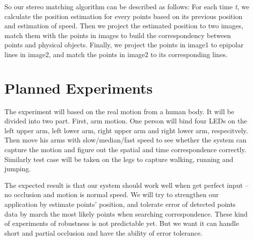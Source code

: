 \documentclass[10pt,twocolumn,letterpaper]{article}
\begin{document}
So our stereo matching algorithm can be described as follows: For each 
time {\em t}, we calculate the position estimation for every points based 
on its previous position and estimation of speed. Then we project the estimated
position to two images, match them with the points in images to build the 
correspondency between points and physical objects.
Finally, we project the points in image1 to epipolar lines in image2, 
and match the points in image2 to its corresponding lines.

\section{Planned Experiments}

The experiment will based on the real motion from a human body. It will be divided into two part. First, arm motion. One person will bind four LEDs on the left upper arm, left lower arm, right upper arm and right lower arm, respecitvely. Then move his arms with slow/median/fast speed to see whether the system can capture the motion and figure out the spatial and time correspondence correctly. Similarly test case will be taken on the legs to capture walking, running and jumping.

The expected result is that our system should work well when get perfect input -- no occlusion and motion is normal speed. We will try to strengthen our application by estimate points' position, and tolerate error of detected points data by march the most likely points when searching correspondence. These kind of experiments of robustness is not predictable yet. But we want it can handle short and partial occlusion and have the ability of error tolerance. 


{\small


}

\newpage
\rule{0pt}{1pt}\newpage
\rule{0pt}{1pt}\newpage
\rule{0pt}{1pt}\newpage
\rule{0pt}{1pt}\newpage
\rule{0pt}{1pt}\newpage
\rule{0pt}{1pt}\newpage
\rule{0pt}{1pt}\newpage
\rule{0pt}{1pt}\newpage
\end{document}
